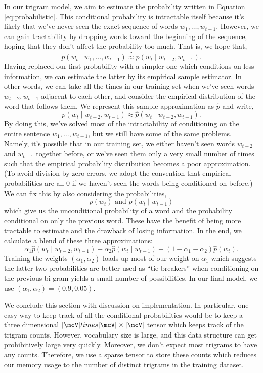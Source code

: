 \documentclass[12pt]{article}
\begin{document}
In our trigram model, we aim to estimate the probability written in Equation
\ref{eq:probabilistic}. This conditional probability is intractable itself
because it's likely that we've never seen the exact sequence of words $w_1,
\ldots, w_{t-1}$. However, we can gain tractability by dropping words toward the
beginning of the sequence, hoping that they don't affect the probability too
much. That is, we hope that,
\[ p(w_t \mid w_1, \ldots, w_{t-1}) \stackrel{?}{\approx} p(w_t \mid w_{t-2},
w_{t-1}).\]
Having replaced our first probability with a simpler one which conditions on
less information, we can estimate the latter by its empirical sample estimator.
In other words, we can take all the times in our training set when we've seen
words $w_{t-2}, w_{t-1}$ adjacent to each other, and consider the empirical
distribution of the word that follows them. We represent this sample
approximation as $\hat{p}$ and write,
\[ p (w_t \mid w_{t-2}, w_{t-1}) \approx \hat{p} (w_t \mid w_{t-2}, w_{t-1}).\]
By doing this, we've solved most of the intractability of conditioning on the
entire sentence $w_1, \ldots, w_{t-1}$, but we still have some of the same
problems. Namely, it's possible that in our training set, we either haven't seen
words $w_{t-2}$ and $w_{t-1}$ together before, or we've seen them only a very
small number of times such that the empirical probability distribution becomes a
poor approximation. (To avoid division by zero errors, we adopt the convention
that empirical probabilities are all 0 if we haven't seen the words being
conditioned on before.) We can fix this by also considering the probabilities,
\[ p(w_t) \text{ and } p(w_t \mid w_{t-1})\]
which give us the unconditional probability of a word and the probability
conditional on only the previous word. These have the benefit of being more
tractable to estimate and the drawback of losing information. In the end, we
calculate a blend of these three approximations:
\[ \alpha_1 \hat{p}(w_t \mid w_{t-2}, w_{t-1}) + \alpha_2
\hat{p}(w_t \mid w_{t-1}) + (1-\alpha_1-\alpha_2)\hat{p}(w_t).\]
Training the weights $(\alpha_1, \alpha_2)$ loads up most of our weight on
$\alpha_1$ which suggests the latter two probabilities are better used as
``tie-breakers'' when conditioning on the previous bi-gram yields a small number
of possibilities. In our final model, we use $(\alpha_1, \alpha_2) = (0.9,
0.05)$.

We conclude this section with discussion on implementation. In particular, one
easy way to keep track of all the conditional probabilities would be to keep a
three dimensional $|\mcV| times |\mcV| \times |\mcV|$ tensor which keeps track
of the trigram counts. However, vocabulary size is large, and this data
structure can get prohibitively large very quickly. Moreover, we don't expect
most trigrams to have any counts. Therefore, we use a sparse tensor to store
these counts which reduces our memory usage to the number of distinct trigrams
in the training dataset.
\end{document}
